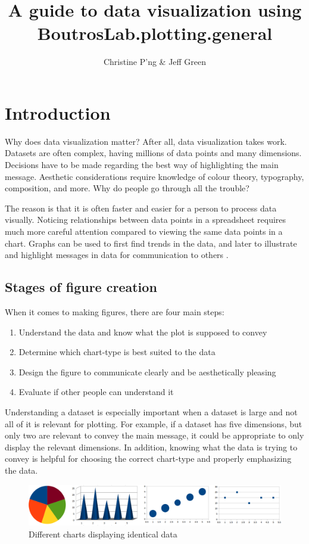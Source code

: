 \documentclass[letterpaper]{report}\usepackage[]{graphicx}\usepackage[]{color}
\title{A guide to data visualization using BoutrosLab.plotting.general}
\author{Christine P'ng \& Jeff Green}
\begin{document}
\maketitle

\tableofcontents
\newpage
\section{Introduction}
Why does data visualization matter? After all, data visualization takes work. Datasets are often complex, having millions of data points and many dimensions. Decisions have to be made regarding the best way of highlighting the main message. Aesthetic considerations require knowledge of colour theory, typography, composition, and more. Why do people go through all the trouble?

The reason is that it is often faster and easier for a person to process data visually. Noticing relationships between data points in a spreadsheet requires much more careful attention compared to viewing the same data points in a chart. Graphs can be used to first find trends in the data, and later to illustrate and highlight messages in data for communication to others \cite{Anscombe, wong-dataexploration}.

\subsection{Stages of figure creation}
When it comes to making figures, there are four main steps:
\begin{enumerate}
\item Understand the data and know what the plot is supposed to convey
\item Determine which chart-type is best suited to the data
\item Design the figure to communicate clearly and be aesthetically pleasing
\item Evaluate if other people can understand it
\end{enumerate}

Understanding a dataset is especially important when a dataset is large and not all of it is relevant for plotting. For example, if a dataset has five dimensions, but only two are relevant to convey the main message, it could be appropriate to only display the relevant dimensions. In addition, knowing what the data is trying to convey is helpful for choosing the correct chart-type and properly emphasizing the data. 

\begin{figure}[!ht]
  \begin{center}
     \includegraphics[width=160mm]{Figures/intro_plotting_ex.png}
     \caption{Different charts displaying identical data}
  \end{center}
\end{figure}
\end{document}
